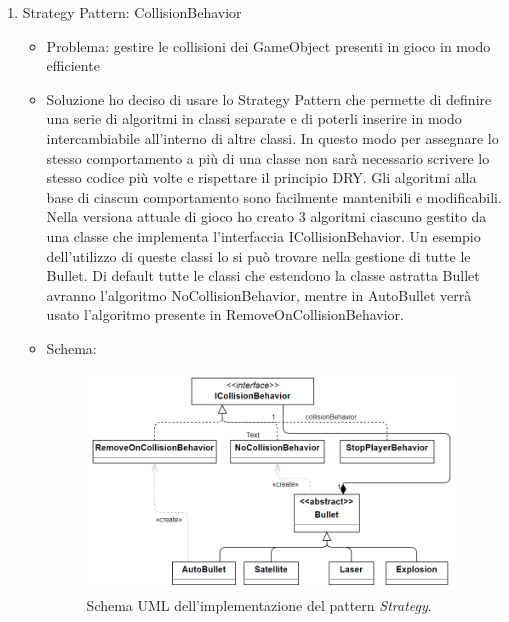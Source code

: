\documentclass[a4paper,12pt]{report}
\begin{document}
\begin{enumerate}
		\item Strategy Pattern: CollisionBehavior
	\begin{itemize}
		\item Problema: gestire le collisioni dei GameObject presenti in gioco in modo efficiente 
		\item Soluzione ho deciso di usare lo Strategy Pattern che permette di definire una serie di algoritmi in classi separate e di poterli inserire in modo intercambiabile all'interno di altre classi.
		In questo modo per assegnare lo stesso comportamento a più di una classe non sarà necessario scrivere lo stesso codice più volte e rispettare il principio DRY.
		Gli algoritmi alla base di ciascun comportamento sono facilmente mantenibili e modificabili. \\
		Nella versiona attuale di gioco ho creato 3 algoritmi ciascuno gestito da una classe che implementa l'interfaccia ICollisionBehavior. 
		Un esempio dell'utilizzo di queste classi lo si può trovare nella gestione di tutte le Bullet. Di default tutte le classi che estendono la classe astratta Bullet avranno l'algoritmo NoCollisionBehavior, mentre in AutoBullet verrà usato l'algoritmo presente in RemoveOnCollisionBehavior.
		\item Schema:
		\begin{figure}[H]
			\centering{}
			\includegraphics[width=\textwidth]{img/strategy.png}
			\caption{Schema UML dell'implementazione del pattern \emph{Strategy}. }
			\label{img:Strategy Pattern}
		\end{figure}
		

\end{itemize}
\end{enumerate}
\end{document}
